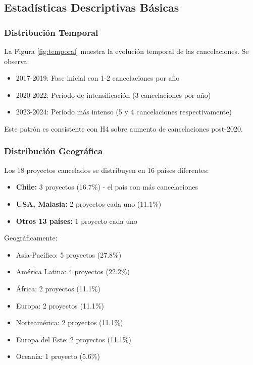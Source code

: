 \documentclass[12pt]{article}
\begin{document}
\subsection{Estadísticas Descriptivas Básicas}

\subsubsection{Distribución Temporal}

La Figura \ref{fig:temporal} muestra la evolución temporal de las cancelaciones. Se observa:

\begin{itemize}
    \item 2017-2019: Fase inicial con 1-2 cancelaciones por año
    \item 2020-2022: Período de intensificación (3 cancelaciones por año)
    \item 2023-2024: Período más intenso (5 y 4 cancelaciones respectivamente)
\end{itemize}

Este patrón es consistente con H4 sobre aumento de cancelaciones post-2020.

\subsubsection{Distribución Geográfica}

Los 18 proyectos cancelados se distribuyen en 16 países diferentes:

\begin{itemize}
    \item \textbf{Chile:} 3 proyectos (16.7\%) - el país con más cancelaciones
    \item \textbf{USA, Malasia:} 2 proyectos cada uno (11.1\%)
    \item \textbf{Otros 13 países:} 1 proyecto cada uno
\end{itemize}

Geográficamente:
\begin{itemize}
    \item Asia-Pacífico: 5 proyectos (27.8\%)
    \item América Latina: 4 proyectos (22.2\%)
    \item África: 2 proyectos (11.1\%)
    \item Europa: 2 proyectos (11.1\%)
    \item Norteamérica: 2 proyectos (11.1\%)
    \item Europa del Este: 2 proyectos (11.1\%)
    \item Oceanía: 1 proyecto (5.6\%)
\end{itemize}
\end{document}
